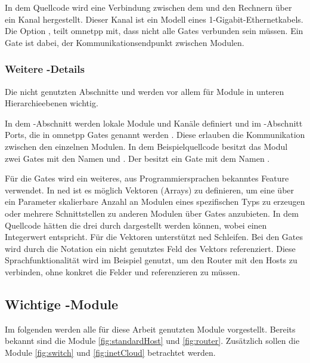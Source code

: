 In dem Quellcode wird \zB eine Verbindung zwischen dem  und den Rechnern  über ein  Kanal hergestellt. Dieser Kanal ist ein Modell eines 1-Gigabit-Ethernetkabels. Die Option , teilt \gls{omnetpp} mit, dass nicht alle Gates verbunden sein müssen. Ein Gate ist dabei, der Kommunikationsendpunkt zwischen Modulen.

\subsubsection{Weitere -Details}
Die nicht genutzten Abschnitte  und  werden vor allem für Module in unteren Hierarchieebenen wichtig.

In dem -Abschnitt werden lokale Module und Kanäle definiert und im -Abschnitt Ports, die in \gls{omnetpp} Gates genannt werden \cite[]{OmnetManual}. Diese erlauben die Kommunikation zwischen den einzelnen Modulen. In dem Beispielquellcode besitzt das Modul  zwei Gates mit den Namen  und . Der  besitzt ein Gate mit dem Namen .

Für die Gates wird ein weiteres, aus Programmiersprachen bekanntes Feature verwendet. In \gls{ned} ist es möglich Vektoren (Arrays) zu definieren, um \zB eine über ein Parameter skalierbare Anzahl an Modulen eines spezifischen Typs zu erzeugen oder mehrere Schnittstellen zu anderen Modulen über Gates anzubieten. In dem Quellcode hätten die drei  durch  dargestellt werden können, wobei  einen Integerwert entspricht. Für die Vektoren unterstützt \gls{ned} Schleifen. Bei den Gates wird durch die Notation \ned{++} ein nicht genutztes Feld des Vektors  referenziert. \cite[]{OmnetManual} Diese Sprachfunktionalität wird im Beispiel genutzt, um den Router mit den Hosts zu verbinden, ohne konkret die Felder  und  referenzieren zu müssen.

\subsection{Wichtige -Module}
Im folgenden werden alle für diese Arbeit genutzten Module vorgestellt. Bereits bekannt sind die Module  \ref{fig:standardHost} und  \ref{fig:router}. Zusätzlich sollen die Module  \ref{fig:switch} und  \ref{fig:inetCloud} betrachtet werden.

